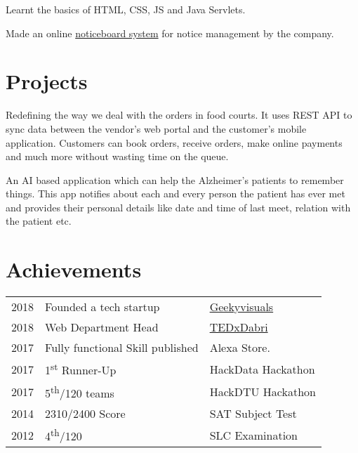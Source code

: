 \documentclass[]{openfont}
\begin{document}
\begin{minipage}[t]{0.66\textwidth}
\begin{tightemize}
\item Learnt the basics of HTML, CSS, JS and Java Servlets.
\item Made an online \href{https://demo-ournoticeboard.herokuapp.com}{noticeboard system} for notice management by the company.
\end{tightemize}
\sectionsep


\section{Projects}

Redefining the way we deal with the orders in food courts. It uses REST API to sync data between the vendor's web portal and the customer's mobile application. Customers can book orders, receive orders, make online payments and much more without wasting time on the queue.
\sectionsep

An AI based application which can help the Alzheimer's patients to remember things. This app notifies about each and every person the patient has ever met and provides their personal details like date and time of last meet, relation with the patient etc.
\sectionsep


\section{Achievements} 
\begin{tabular}{rll}
2018         & Founded a tech startup & \href{http://geekyvisuals.tech}{Geekyvisuals}\\
2018	     & Web Department Head  & \href{http://tedxdabri.in}{TEDxDabri}\\
2017         & Fully functional Skill published & Alexa Store.\\
2017	     & 1\textsuperscript{st} Runner-Up  & HackData Hackathon\\
2017	     & 5\textsuperscript{th}/120 teams  & HackDTU Hackathon\\
2014         & 2310/2400 Score & SAT Subject Test\\    
2012	     & 4\textsuperscript{th}/120  & SLC Examination\\

\end{tabular}
\sectionsep

\end{minipage} 
\end{document}

